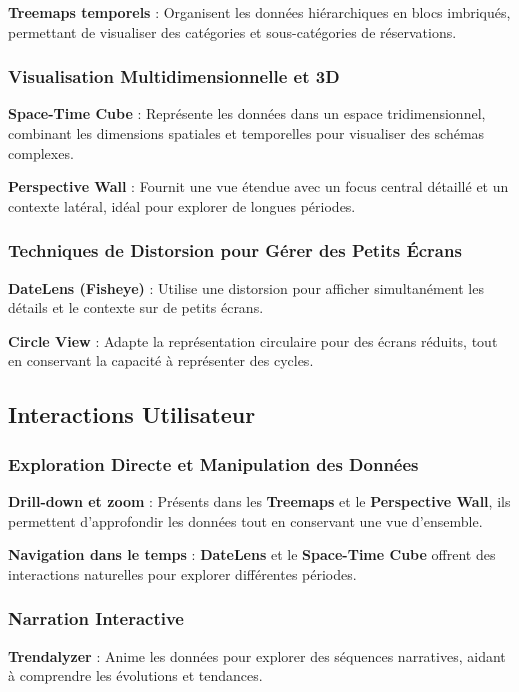 \documentclass[runningheads]{llncs}
\begin{document}
\textbf{Treemaps temporels} : Organisent les données hiérarchiques en blocs imbriqués, permettant de visualiser des catégories et sous-catégories de réservations.

\subsubsection{Visualisation Multidimensionnelle et 3D}
\textbf{Space-Time Cube} : Représente les données dans un espace tridimensionnel, combinant les dimensions spatiales et temporelles pour visualiser des schémas complexes.

\textbf{Perspective Wall} : Fournit une vue étendue avec un focus central détaillé et un contexte latéral, idéal pour explorer de longues périodes.

\subsubsection{Techniques de Distorsion pour Gérer des Petits Écrans}
\textbf{DateLens (Fisheye)} : Utilise une distorsion pour afficher simultanément les détails et le contexte sur de petits écrans.

\textbf{Circle View} : Adapte la représentation circulaire pour des écrans réduits, tout en conservant la capacité à représenter des cycles.

\subsection{Interactions Utilisateur}

\subsubsection{Exploration Directe et Manipulation des Données}
\textbf{Drill-down et zoom} : Présents dans les \textbf{Treemaps} et le \textbf{Perspective Wall}, ils permettent d'approfondir les données tout en conservant une vue d'ensemble.

\textbf{Navigation dans le temps} : \textbf{DateLens} et le \textbf{Space-Time Cube} offrent des interactions naturelles pour explorer différentes périodes.

\subsubsection{Narration Interactive}
\textbf{Trendalyzer} : Anime les données pour explorer des séquences narratives, aidant à comprendre les évolutions et tendances.
\end{document}
